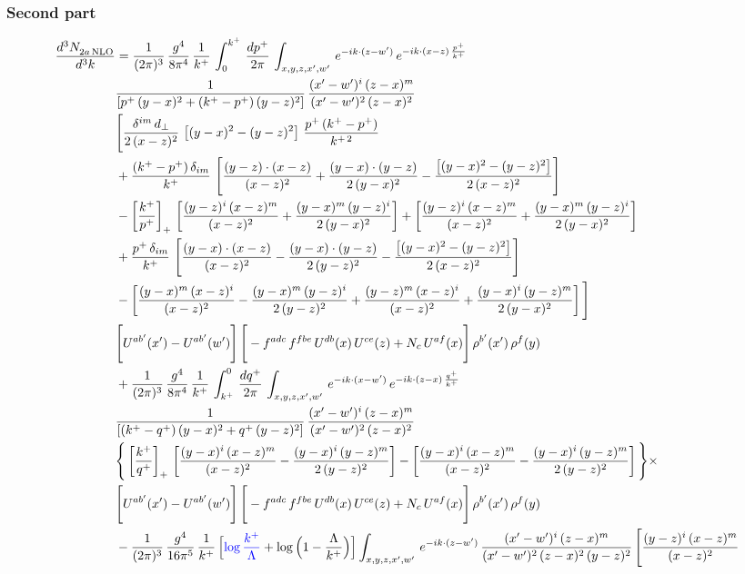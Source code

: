 \documentclass[9pt]{article}
\numberwithin{equation}{section}
\begin{document}
\subsubsection*{Second part}
\begin{align}
    \frac{d^{3}N_{2a\,\rm NLO}^{\rm}}{d^{3}k}  & =  \frac{1}{(2\pi)^{3}}\, \frac{g^{4}}{8\pi^{4}}\,\frac{1}{k^{+}}\,\int_{0}^{k^{+}}\, \frac{dp^{+}}{2\pi}\,\int_{x,y,z,x',w'}\, e^{-ik\cdot(z-w')}\,e^{-ik\cdot (x-z)\,\frac{p^{+}}{k^{+}}}\,\notag \\ & \frac{1}{\left[p^{+}\,(y-x)^{2}+(k^{+}-p^{+})\,(y-z)^{2}\right]}\, \frac{(x'-w')^{i}\,(z-x)^{m}}{(x'-w')^{2}\,(z-x)^{2}} \notag \\ & \Bigg[\frac{\delta^{im}\,d_{\perp}}{2\,(x-z)^{2}}\,\left[(y-x)^{2}-(y-z)^{2}\right]\,\frac{p^{+}\,(k^{+}-p^{+})}{k^{+\,2}}\notag \\ & +\frac{(k^{+}-p^{+})\,\delta_{im}}{k^{+}}\,\left[\frac{(y-z)\cdot (x-z)}{(x-z)^{2}}+\frac{(y-x)\cdot (y-z)}{2\,(y-x)^{2}}-\frac{\left[(y-x)^{2}-(y-z)^{2}\right]}{2\,(x-z)^{2}}\right]\notag \\ & -\left[\frac{k^{+}}{p^{+}}\right]_{+}\,\left[\frac{(y-z)^{i}\,(x-z)^{m}}{(x-z)^{2}}+\frac{(y-x)^{m}\,(y-z)^{i}}{2\,(y-x)^{2}}\right]+ \left[\frac{(y-z)^{i}\,(x-z)^{m}}{(x-z)^{2}}+\frac{(y-x)^{m}\,(y-z)^{i}}{2\,(y-x)^{2}}\right]\notag \\ & +\frac{p^{+}\,\delta_{im}}{k^{+}}\,\left[\frac{(y-x)\cdot (x-z)}{(x-z)^{2}}-\frac{(y-x)\cdot (y-z)}{2\,(y-z)^{2}}-\frac{\left[(y-x)^{2}-(y-z)^{2}\right]}{2\,(x-z)^{2}}\right]\notag \\ &-\left[\frac{(y-x)^{m}\,(x-z)^{i}}{(x-z)^{2}}-\frac{(y-x)^{m}\,(y-z)^{i}}{2\,(y-z)^{2}}+\frac{(y-z)^{m}\,(x-z)^{i}}{(x-z)^{2}}+\frac{(y-x)^{i}\,(y-z)^{m}}{2\,(y-x)^{2}}\right]\Bigg] \notag \\ & \Bigg[U^{ab'}(x')-U^{ab'}(w')\Bigg]\,\Bigg[-f^{adc}\,f^{fbe}\,U^{db}(x)\,U^{ce}(z)+N_{c}\,U^{af}(x)\Bigg]\,\rho^{b'}(x')\,\rho^{f}(y)\notag \\ & + \frac{1}{(2\pi)^{3}}\,\frac{g^{4}}{8\pi^{4}}\,\frac{1}{k^{+}}\, \int^{0}_{k^{+}}\, \frac{dq^{+}}{2\pi} \,  \int_{x,y,z,x',w'}\,e^{-ik\cdot(x-w')}\,e^{-ik\cdot (z-x)\,\frac{q^{+}}{k^{+}}}\,\notag \\ & \frac{1}{\left[(k^{+}-q^{+})\,(y-x)^{2}+q^{+}\,(y-z)^{2}\right]}\, \frac{(x'-w')^{i}\,(z-x)^{m}}{(x'-w')^{2}\,(z-x)^{2}} \notag \\ &\Bigg\{\left[\frac{k^{+}}{q^{+}}\right]_{+}\,\left[\frac{(y-x)^{i}\,(x-z)^{m}}{(x-z)^{2}}-\frac{(y-x)^{i}\,(y-z)^{m}}{2\,(y-z)^{2}}\right] -\left[\frac{(y-x)^{i}\,(x-z)^{m}}{(x-z)^{2}}-\frac{(y-x)^{i}\,(y-z)^{m}}{2\,(y-z)^{2}}\right]\Bigg\}\times\,\notag \\ & \Bigg[U^{ab'}(x')-U^{ab'}(w')\Bigg]\,\Bigg[-f^{adc}\,f^{fbe}\,U^{db}(x)\,U^{ce}(z)+N_{c}\,U^{af}(x)\Bigg]\,\rho^{b'}(x')\,\rho^{f}(y)\notag \\ & - \frac{1}{(2\pi)^{3}}\, \frac{g^{4}}{16\pi^{5}}\,\frac{1}{k^{+}}\,\Big[{\color{blue}\log\frac{k^{+}}{\Lambda}}+\log\Big(1-\frac{\Lambda}{k^{+}}\Big)\Big] \int_{x,y,z,x',w'}\,e^{-ik\cdot(z-w')}\, \frac{(x'-w')^{i}\,(z-x)^{m}}{(x'-w')^{2}\,(z-x)^{2}\, (y-z)^{2}}\,\Bigg[\frac{(y-z)^{i}\,(x-z)^{m}}{(x-z)^{2}}\notag \\ & 
\end{align}
\end{document}
